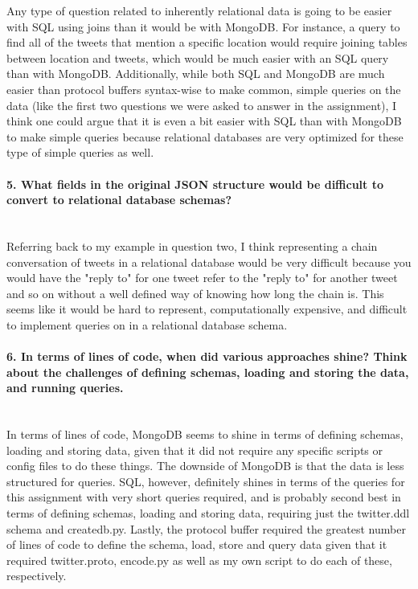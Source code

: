 \documentclass[12pt]{article}
\begin{document}
Any type of question related to inherently relational data is going to be easier with SQL using joins than it would be with MongoDB. For instance, a query to find all of the tweets that mention a specific location would require joining tables between location and tweets, which would be much easier with an SQL query than with MongoDB. Additionally, while both SQL and MongoDB are much easier than protocol buffers syntax-wise to make common, simple queries on the data (like the first two questions we were asked to answer in the assignment), I think one could argue that it is even a bit easier with SQL than with MongoDB to make simple queries because relational databases are very optimized for these type of simple queries as well. 

\paragraph{5. What fields in the original JSON structure would be difficult to convert to relational database schemas?}\mbox{}\\

Referring back to my example in question two, I think representing a chain conversation of tweets in a relational database would be very difficult because you would have the "reply to" for one tweet refer to the "reply to" for another tweet and so on without a well defined way of knowing how long the chain is. This seems like it would be hard to represent, computationally expensive, and difficult to implement queries on in a relational database schema. 

\paragraph{6. In terms of lines of code, when did various approaches shine? Think about the challenges of defining schemas, loading and storing the data, and running queries.}\mbox{}\\

In terms of lines of code, MongoDB seems to shine in terms of defining schemas, loading and storing data, given that it did not require any specific scripts or config files to do these things. The downside of MongoDB is that the data is less structured for queries. SQL, however, definitely shines in terms of the queries for this assignment with very short queries required, and is probably second best in terms of defining schemas, loading and storing data, requiring just the twitter.ddl schema and createdb.py. Lastly, the protocol buffer required the greatest number of lines of code to define the schema, load, store and query data given that it required twitter.proto, encode.py as well as my own script to do each of these, respectively.   
\end{document}
